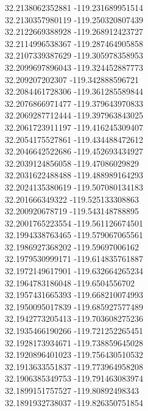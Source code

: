 {32.2138062352881	-119.231689951514\\
32.2130357980119	-119.250320807439\\
32.2122669388928	-119.268912423727\\
32.2114996538367	-119.287464905858\\
32.2107339387629	-119.305978358953\\
32.2099697896043	-119.324452887773\\
32.209207202307	-119.342888596721\\
32.2084461728306	-119.361285589844\\
32.2076866971477	-119.379643970833\\
32.2069287712444	-119.397963843025\\
32.2061723911197	-119.416245309407\\
32.2054175527861	-119.434488472612\\
32.2046642522686	-119.452693434927\\
32.2039124856058	-119.47086029829\\
32.2031622488488	-119.488989164293\\
32.2024135380619	-119.507080134183\\
32.201666349322	-119.525133308863\\
32.200920678719	-119.543148788895\\
32.2001765223554	-119.561126674501\\
32.1994338763465	-119.579067065561\\
32.1986927368202	-119.59697006162\\
32.1979530999171	-119.614835761887\\
32.1972149617901	-119.632664265234\\
32.1964783186048	-119.6504556702\\
32.1957431665393	-119.668210074993\\
32.1950095017839	-119.685927577489\\
32.1942773205413	-119.703608275236\\
32.1935466190266	-119.721252265451\\
32.1928173934671	-119.738859645028\\
32.1920896401023	-119.756430510532\\
32.1913633551837	-119.773964958208\\
32.1906385349753	-119.791463083974\\
32.1899151757527	-119.80892498343\\
32.1891932738037	-119.826350751854\\
}
